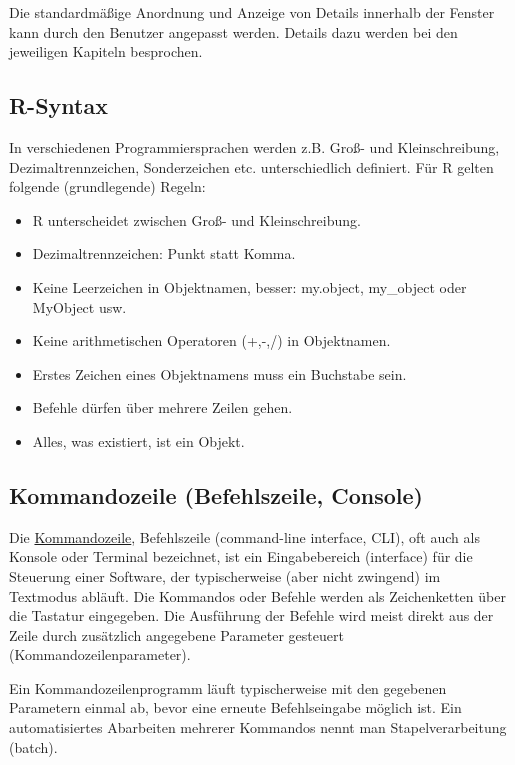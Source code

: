 \documentclass[]{article}
\providecommand{\tightlist}{%
  \setlength{\itemsep}{0pt}\setlength{\parskip}{0pt}}
\begin{document}
Die standardmäßige Anordnung und Anzeige von Details innerhalb der
Fenster kann durch den Benutzer angepasst werden. Details dazu werden
bei den jeweiligen Kapiteln besprochen.

\subsection*{R-Syntax}\label{r-syntax}

In verschiedenen Programmiersprachen werden z.B. Groß- und
Kleinschreibung, Dezimaltrennzeichen, Sonderzeichen etc. unterschiedlich
definiert. Für R gelten folgende (grundlegende) Regeln:

\begin{itemize}
\tightlist
\item
  R unterscheidet zwischen Groß- und Kleinschreibung.
\item
  Dezimaltrennzeichen: Punkt statt Komma.
\item
  Keine Leerzeichen in Objektnamen, besser: my.object, my\_object oder
  MyObject usw.
\item
  Keine arithmetischen Operatoren (+,-,/) in Objektnamen.
\item
  Erstes Zeichen eines Objektnamens muss ein Buchstabe sein.
\item
  Befehle dürfen über mehrere Zeilen gehen.
\item
  Alles, was existiert, ist ein Objekt.
\end{itemize}

\subsection*{Kommandozeile (Befehlszeile,
Console)}\label{kommandozeile-befehlszeile-console}

Die \href{https://de.wikipedia.org/wiki/Kommandozeile}{Kommandozeile},
Befehlszeile (command-line interface, CLI), oft auch als Konsole oder
Terminal bezeichnet, ist ein Eingabebereich (interface) für die
Steuerung einer Software, der typischerweise (aber nicht zwingend) im
Textmodus abläuft. Die Kommandos oder Befehle werden als Zeichenketten
über die Tastatur eingegeben. Die Ausführung der Befehle wird meist
direkt aus der Zeile durch zusätzlich angegebene Parameter gesteuert
(Kommandozeilenparameter).

Ein Kommandozeilenprogramm läuft typischerweise mit den gegebenen
Parametern einmal ab, bevor eine erneute Befehlseingabe möglich ist. Ein
automatisiertes Abarbeiten mehrerer Kommandos nennt man
Stapelverarbeitung (batch).
\end{document}
